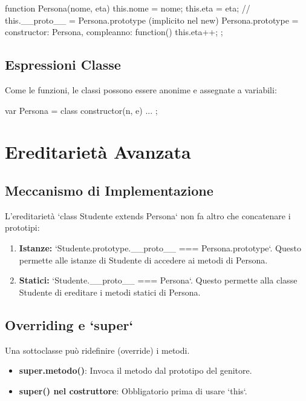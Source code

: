 \begin{jsbox}[title={Equivalente ES5 (Pseudocodice)}]
function Persona(nome, eta) {
    this.nome = nome;
    this.eta = eta;
    // this.__proto__ = Persona.prototype (implicito nel new)
}
Persona.prototype = {
    constructor: Persona,
    compleanno: function() { this.eta++; }
};
\end{jsbox}

\subsection{Espressioni Classe}
Come le funzioni, le classi possono essere anonime e assegnate a variabili:
\begin{jsbox}
var Persona = class {
    constructor(n, e) { ... }
};
\end{jsbox}

\section{Ereditarietà Avanzata}

\subsection{Meccanismo di Implementazione}
L'ereditarietà `class Studente extends Persona` non fa altro che concatenare i prototipi:
\begin{enumerate}
    \item \textbf{Istanze:} `Studente.prototype.__proto__ === Persona.prototype`. Questo permette alle istanze di Studente di accedere ai metodi di Persona.
    \item \textbf{Statici:} `Studente.__proto__ === Persona`. Questo permette alla classe Studente di ereditare i metodi statici di Persona.
\end{enumerate}

\subsection{Overriding e `super`}
Una sottoclasse può ridefinire (override) i metodi.
\begin{itemize}
    \item \textbf{super.metodo()}: Invoca il metodo dal prototipo del genitore.
    \item \textbf{super() nel costruttore}: Obbligatorio prima di usare `this`.
\end{itemize}

